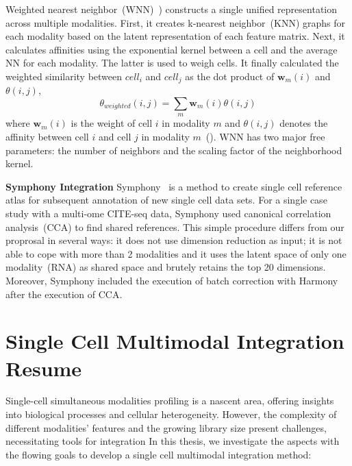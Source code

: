 \begin{description}
  \item[Seurat WNN]
  Weighted nearest neighbor~(WNN)~\citep{hao2021seurat4}) constructs a single unified representation across multiple modalities. First, it creates k-nearest neighbor~(KNN) graphs for each modality based on the latent representation of each feature matrix. Next, it calculates affinities using the exponential kernel between a cell and the average NN for each modality. The latter is used to weigh cells. It finally calculated the weighted similarity between $cell_i$ and $cell_j$ as the dot product of $\textbf{w}_m(i)$ and $\theta(i,j)$,
  \begin{equation}
  	\theta_{weighted}(i,j)=\sum_{m} \textbf{w}_m(i)\theta(i,j)
  \end{equation}
  where $\textbf{w}_m(i)$ is the weight of cell $i$ in modality $m$ and $\theta(i,j)$ denotes the affinity between cell $i$ and cell $j$ in modality $m$~(). WNN has two major free parameters: the number of neighbors and the scaling factor of the neighborhood kernel.


  \item \textbf{Symphony Integration}
  Symphony~\citep{kang2021symphony} is a method to create single cell reference atlas for subsequent annotation of new single cell data sets. For a single case study with a multi-ome CITE-seq data, Symphony used canonical correlation analysis~(CCA) to find shared references. This simple procedure differs from our proprosal in several ways: it does not use dimension reduction as input; it is not able to cope with more than 2 modalities and it uses the latent space of only one modality~(RNA) as shared space and brutely retains the top 20 dimensions. Moreover, Symphony included the execution of batch correction with Harmony after the execution of CCA.
\end{description}


\section{Single Cell Multimodal Integration Resume}
\label{bgInte:MOJITOO_resume}
Single-cell simultaneous modalities profiling is a nascent area, offering insights into biological processes and cellular heterogeneity. However, the complexity of different modalities' features and the growing library size present challenges, necessitating tools for integration In this thesis, we investigate the aspects with the flowing goals to develop a single cell multimodal integration method:

